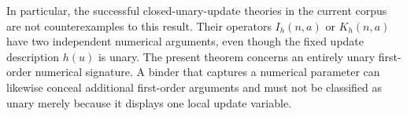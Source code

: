 In particular, the successful closed-unary-update theories in the
current corpus are not counterexamples to this result. Their operators
$I_h(n,a)$ or $K_h(n,a)$ have two independent numerical arguments,
even though the fixed update description $h(u)$ is unary. The present
theorem concerns an entirely unary first-order numerical signature.
A binder that captures a numerical parameter can likewise conceal
additional first-order arguments and must not be classified as unary
merely because it displays one local update variable.

